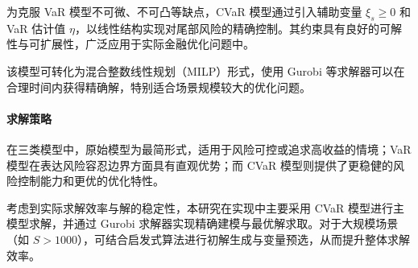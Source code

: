 \documentclass[nonblindrev]{write_paper}
\begin{document}
为克服 VaR 模型不可微、不可凸等缺点，CVaR 模型通过引入辅助变量 $\xi_s \ge 0$ 和 VaR 估计值 $\eta$，以线性结构实现对尾部风险的精确控制。其约束具有良好的可解性与可扩展性，广泛应用于实际金融优化问题中。

该模型可转化为混合整数线性规划（MILP）形式，使用 Gurobi 等求解器可以在合理时间内获得精确解，特别适合场景规模较大的优化问题。

\vspace{1em}
\paragraph{求解策略}

在三类模型中，原始模型为最简形式，适用于风险可控或追求高收益的情境；VaR 模型在表达风险容忍边界方面具有直观优势；而 CVaR 模型则提供了更稳健的风险控制能力和更优的优化特性。

考虑到实际求解效率与解的稳定性，本研究在实现中主要采用 CVaR 模型进行主模型求解，并通过 Gurobi 求解器实现精确建模与最优解求取。对于大规模场景（如 $S > 1000$），可结合启发式算法进行初解生成与变量预选，从而提升整体求解效率。

\newpage
 

\end{document}
